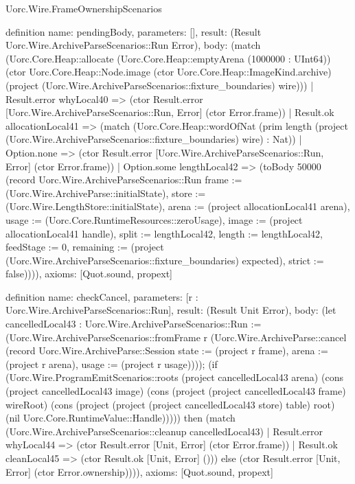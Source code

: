 \begin{lexlean}{Uorc.Wire.FrameOwnershipScenarios}
\begin{semanticmodule}
definition{
  name: pendingBody,
  parameters: [],
  result: (Result Uorc.Wire.ArchiveParseScenarios::Run Error),
  body: (match (Uorc.Core.Heap::allocate (Uorc.Core.Heap::emptyArena (1000000 : UInt64)) (ctor Uorc.Core.Heap::Node.image (ctor Uorc.Core.Heap::ImageKind.archive) (project (Uorc.Wire.ArchiveParseScenarios::fixture_boundaries) wire)))
    | Result.error whyLocal40 => (ctor Result.error [Uorc.Wire.ArchiveParseScenarios::Run, Error] (ctor Error.frame))
    | Result.ok allocationLocal41 => (match (Uorc.Core.Heap::wordOfNat (prim length (project (Uorc.Wire.ArchiveParseScenarios::fixture_boundaries) wire) : Nat))
      | Option.none => (ctor Result.error [Uorc.Wire.ArchiveParseScenarios::Run, Error] (ctor Error.frame))
      | Option.some lengthLocal42 => (toBody 50000 (record Uorc.Wire.ArchiveParseScenarios::Run {frame := (Uorc.Wire.ArchiveParse::initialState), store := (Uorc.Wire.LengthStore::initialState), arena := (project allocationLocal41 arena), usage := (Uorc.Core.RuntimeResources::zeroUsage), image := (project allocationLocal41 handle), split := lengthLocal42, length := lengthLocal42, feedStage := 0, remaining := (project (Uorc.Wire.ArchiveParseScenarios::fixture_boundaries) expected), strict := false})))),
  axioms: [Quot.sound, propext]
}

definition{
  name: checkCancel,
  parameters: [r : Uorc.Wire.ArchiveParseScenarios::Run],
  result: (Result Unit Error),
  body: (let cancelledLocal43 : Uorc.Wire.ArchiveParseScenarios::Run := (Uorc.Wire.ArchiveParseScenarios::fromFrame r (Uorc.Wire.ArchiveParse::cancel (record Uorc.Wire.ArchiveParse::Session {state := (project r frame), arena := (project r arena), usage := (project r usage)}))); (if (Uorc.Wire.ProgramEmitScenarios::roots (project cancelledLocal43 arena) (cons (project cancelledLocal43 image) (cons (project (project cancelledLocal43 frame) wireRoot) (cons (project (project (project cancelledLocal43 store) table) root) (nil Uorc.Core.RuntimeValue::Handle))))) then (match (Uorc.Wire.ArchiveParseScenarios::cleanup cancelledLocal43)
    | Result.error whyLocal44 => (ctor Result.error [Unit, Error] (ctor Error.frame))
    | Result.ok cleanLocal45 => (ctor Result.ok [Unit, Error] ())) else (ctor Result.error [Unit, Error] (ctor Error.ownership)))),
  axioms: [Quot.sound, propext]
}


\end{semanticmodule}
\end{lexlean}
